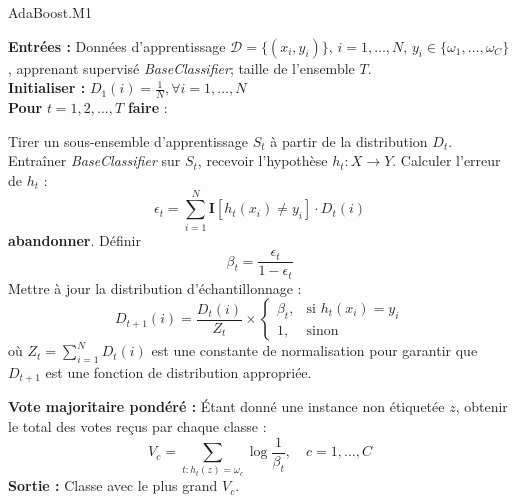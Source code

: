 \begin{algorithm}
	\caption{AdaBoost.M1~\cite{polikar2012ensemble}}
	\textbf{Entrées :} Données d'apprentissage $\mathcal{D} = \{(x_i, y_i)\}$, $i = 1, \dots, N$, $y_i \in \{\omega_1, \dots, \omega_C\}$, apprenant supervisé \textit{BaseClassifier}; taille de l'ensemble $T$. \\
	\textbf{Initialiser :} $D_1(i) = \frac{1}{N}, \forall i = 1, \dots, N$ \\
	\textbf{Pour} $t = 1, 2, \dots, T$ \textbf{faire} : \\
	\begin{algorithmic}[1]
		\State Tirer un sous-ensemble d'apprentissage $S_t$ à partir de la distribution $D_t$.
		\State Entraîner \textit{BaseClassifier} sur $S_t$, recevoir l'hypothèse $h_t: X \rightarrow Y$.
		\State Calculer l'erreur de $h_t$ :
		\[
		\epsilon_t = \sum_{i=1}^{N} \mathbf{I}[h_t(x_i) \neq y_i] \cdot D_t(i)
		\]
		\State \textbf{abandonner}.
		\EndIf
		\State Définir 
		\[
		\beta_t = \frac{\epsilon_t}{1 - \epsilon_t}
		\]
		\State Mettre à jour la distribution d'échantillonnage :
		\[
		D_{t+1}(i) = \frac{D_t(i)}{Z_t} \times 
		\begin{cases}
			\beta_t, & \text{si } h_t(x_i) = y_i \\
			1, & \text{sinon}
		\end{cases}
		\]
		où $Z_t = \sum_{i=1}^{N} D_t(i)$ est une constante de normalisation pour garantir que $D_{t+1}$ est une fonction de distribution appropriée.
		
		\State \textbf{Vote majoritaire pondéré :} Étant donné une instance non étiquetée $z$, obtenir le total des votes reçus par chaque classe :
		\[
		V_c = \sum_{t: h_t(z)=\omega_c} \log \frac{1}{\beta_t}, \quad c = 1, \dots, C
		\]
		\textbf{Sortie :} Classe avec le plus grand $V_c$.
	\end{algorithmic}
\end{algorithm}
\newpage
